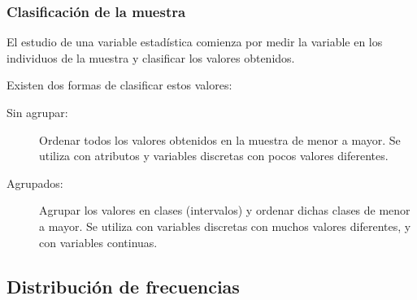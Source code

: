 \begin{frame}
\frametitle{Clasificación de la muestra}
El estudio de una variable estadística comienza por medir la variable en los individuos de la muestra y clasificar los valores obtenidos.

Existen dos formas de clasificar estos valores:
\begin{description}
\item[Sin agrupar:] Ordenar todos los valores obtenidos en la muestra de menor a mayor. Se utiliza con atributos y variables discretas con pocos valores diferentes.
\item[Agrupados:] Agrupar los valores en clases (intervalos) y ordenar dichas clases de menor a mayor. Se utiliza con variables discretas con muchos valores diferentes, y con variables continuas.
\end{description}
\end{frame}


\subsection{Distribución de frecuencias}

